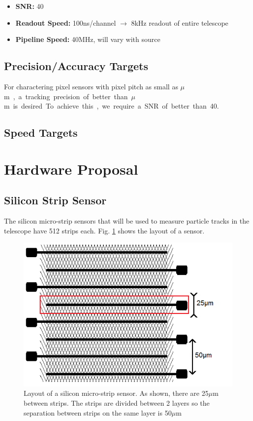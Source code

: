 \documentclass{article}
\newcommand{\itemt}[1]{\item \textbf{#1}}
\newcommand{\um}{$\mu$m}
\begin{document}
\begin{itemize}
  \itemt{\gls{SNR}:} 40
  \itemt{Readout Speed:} 100ns/channel $\rightarrow$ 8kHz readout of entire telescope
  \itemt{Pipeline Speed:} 40MHz, will vary with source
\end{itemize}


\subsection{Precision/Accuracy Targets}
\label{sec:PerformanceTargets}
For charactering pixel sensors with pixel pitch as small as \unit[25]{\um}, a tracking precision of better than \unit[1]{\um} is desired. To achieve this, we require a \gls{SNR} of better than 40.
\subsection{Speed Targets}

\section{Hardware Proposal}

\subsection{Silicon Strip Sensor}
The silicon micro-strip sensors that will be used to measure particle tracks in the telescope have 512 strips each. Fig. \ref{fig:Microstrip_Sensor} shows the layout of a sensor.

\begin{figure}[h]
  \centering
  \includegraphics{./figures/Microstrip_Sensor.png}
  \caption{Layout of a silicon micro-strip sensor. As shown, there are 25$\mu$m between strips. The strips are divided between 2 layers so the separation between strips on the same layer is 50$\mu$m}
  \label{fig:Microstrip_Sensor}
\end{figure}
\end{document}
